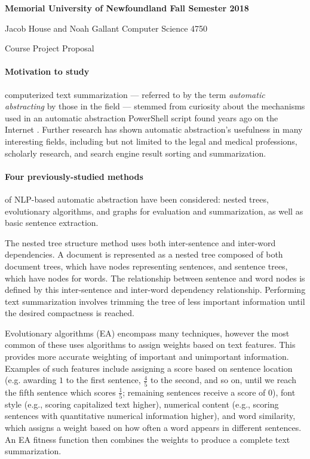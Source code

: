 \documentclass{article}
\begin{document}
	{
		\parindent=0pt
		\bfseries
		Memorial University of Newfoundland \hfill Fall Semester 2018 
		
		Jacob House and Noah Gallant \hfill Computer Science 4750
		
		\vskip 2pc
		
		{
			\Large \hfill Course Project Proposal \hfill
		}
	}

	\vskip 1pc

	\paragraph{Motivation to study} computerized text summarization --- referred to by the term {\em automatic abstracting}  by those in the field --- stemmed from curiosity about the mechanisms used in an automatic abstraction PowerShell script found years ago on the Internet \cite{PSScript}. Further research has shown automatic abstraction's usefulness in many interesting fields, including but not limited to the legal and medical professions, scholarly research, and search engine result sorting and summarization.
	
	\smallskip
	
	\paragraph{Four previously-studied methods} of NLP-based automatic abstraction have been considered: nested trees, evolutionary algorithms, and graphs for evaluation and summarization, as well as basic sentence extraction.
	
	The nested tree structure method uses both inter-sentence and inter-word dependencies. A document is represented as a nested tree composed of both document trees, which have nodes representing sentences, and sentence trees, which have nodes for words. The relationship between sentence and word nodes is defined by this inter-sentence and inter-word dependency relationship. Performing text summarization involves trimming the tree of less important information until the desired compactness is reached. \cite{art3}
	
	Evolutionary algorithms (EA) encompass many techniques, however the most common of these uses algorithms to assign weights based on text features. This provides more accurate weighting of important and unimportant information. Examples of such features include assigning a score based on sentence location (e.g. awarding $1$ to the first sentence, $\frac{4}{5}$ to the second, and so on, until we reach the fifth sentence which scores $\frac{1}{5}$; remaining sentences receive a score of $0$), font style (e.g., scoring capitalized text higher), numerical content (e.g., scoring sentences with quantitative numerical information higher), and word similarity, which assigns a weight based on how often a word appears in different sentences. An EA fitness function then combines the weights to produce a complete text summarization. \cite{art1}
	
\end{document}
